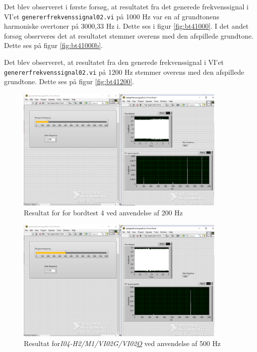 			 Det blev observeret i første forsøg, at resultatet fra det generede frekvenssignal i VI'et \texttt{genererfrekvenssignal02.vi} på 1000 Hz var en af grundtonens harmoniske overtoner på 3000,33 Hz i. Dette ses i figur \ref{fig:bt41000}. I det andet forsøg observeres det at resultatet stemmer overens med den afspillede grundtone. Dette ses på figur \ref{fig:bt41000b}.  
			 
			 Det blev observeret, at resultatet fra den generede frekvenssignal i VI'et \texttt{genererfrekvenssignal02.vi} på 1200 Hz stemmer overens med den afspillede grundtone. Dette ses på figur \ref{fig:bt41200}.  
			 
			
			
			\begin{figure}[htb]
			\centering
				\includegraphics[width=4in]{Bordtest4200Hz}
				\caption{Resultat for for bordtest 4 ved anvendelse af 200 Hz}	
				\label{fig:bt4200}
			\end{figure} 
			
\begin{figure}[htb]
			\centering
				\includegraphics[width=4in]{Bordtest4500Hz}
				\caption{Resultat for\textit{I04-H2/M1/VI02G/VI02\underline{O}} ved anvendelse af 500 Hz}	
				\label{fig:bt4500}
			\end{figure} 			
			
